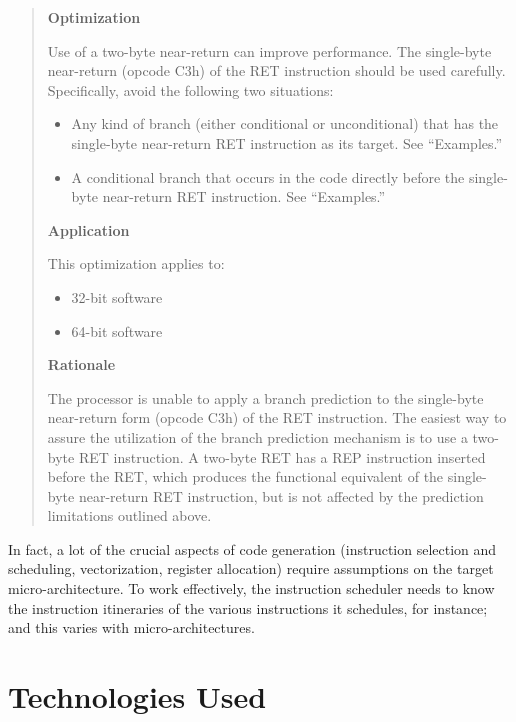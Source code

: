 \begin{quote}

\textbf{Optimization}

Use of a two-byte near-return can improve performance. The single-byte
near-return (opcode C3h) of the RET instruction should be used
carefully. Specifically, avoid the following two situations:

\begin{itemize}
\item Any kind of branch (either conditional or unconditional) that
  has the single-byte near-return RET instruction as its target. See
  ``Examples.''

\item A conditional branch that occurs in the code directly before the
  single-byte near-return RET instruction. See ``Examples.''
\end{itemize}

\textbf{Application}

This optimization applies to:

\begin{itemize}
\item 32-bit software
\item 64-bit software
\end{itemize}

\textbf{Rationale}

The processor is unable to apply a branch prediction to the
single-byte near-return form (opcode C3h) of the RET instruction.  The
easiest way to assure the utilization of the branch prediction
mechanism is to use a two-byte RET instruction. A two-byte RET has a
REP instruction inserted before the RET, which produces the functional
equivalent of the single-byte near-return RET instruction, but is not
affected by the prediction limitations outlined above.

\end{quote}

In fact, a lot of the crucial aspects of code generation (instruction
selection and scheduling, vectorization, register allocation) require
assumptions on the target micro-architecture.  To work effectively,
the instruction scheduler needs to know the instruction itineraries of
the various instructions it schedules, for instance; and this varies
with micro-architectures.

\section{Technologies Used}

